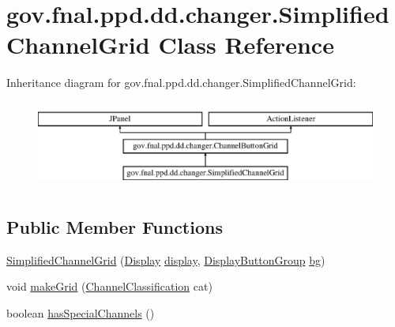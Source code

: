 \hypertarget{classgov_1_1fnal_1_1ppd_1_1dd_1_1changer_1_1SimplifiedChannelGrid}{\section{gov.\-fnal.\-ppd.\-dd.\-changer.\-Simplified\-Channel\-Grid Class Reference}
\label{classgov_1_1fnal_1_1ppd_1_1dd_1_1changer_1_1SimplifiedChannelGrid}
}
Inheritance diagram for gov.\-fnal.\-ppd.\-dd.\-changer.\-Simplified\-Channel\-Grid\-:\begin{figure}[H]
\begin{center}
\leavevmode
\includegraphics[height=2.906574cm]{classgov_1_1fnal_1_1ppd_1_1dd_1_1changer_1_1SimplifiedChannelGrid}
\end{center}
\end{figure}
\subsection*{Public Member Functions}
\begin{DoxyCompactItemize}
\item 
\hyperlink{classgov_1_1fnal_1_1ppd_1_1dd_1_1changer_1_1SimplifiedChannelGrid_a4406e3f9361d9f1650d55318db73f672}{Simplified\-Channel\-Grid} (\hyperlink{interfacegov_1_1fnal_1_1ppd_1_1dd_1_1signage_1_1Display}{Display} \hyperlink{classgov_1_1fnal_1_1ppd_1_1dd_1_1changer_1_1ChannelButtonGrid_a3c06b51489dcaacd16f6efcefe06bcaa}{display}, \hyperlink{classgov_1_1fnal_1_1ppd_1_1dd_1_1util_1_1DisplayButtonGroup}{Display\-Button\-Group} \hyperlink{classgov_1_1fnal_1_1ppd_1_1dd_1_1changer_1_1ChannelButtonGrid_adf258a89161282e5215b4642ecbec812}{bg})
\item 
void \hyperlink{classgov_1_1fnal_1_1ppd_1_1dd_1_1changer_1_1SimplifiedChannelGrid_aabe867c92d6955829fc0b2e0cf9192db}{make\-Grid} (\hyperlink{classgov_1_1fnal_1_1ppd_1_1dd_1_1changer_1_1ChannelClassification}{Channel\-Classification} cat)
\item 
boolean \hyperlink{classgov_1_1fnal_1_1ppd_1_1dd_1_1changer_1_1SimplifiedChannelGrid_a16bc62ae47eb1a4c6af07eeb9eac4eca}{has\-Special\-Channels} ()
\end{DoxyCompactItemize}
